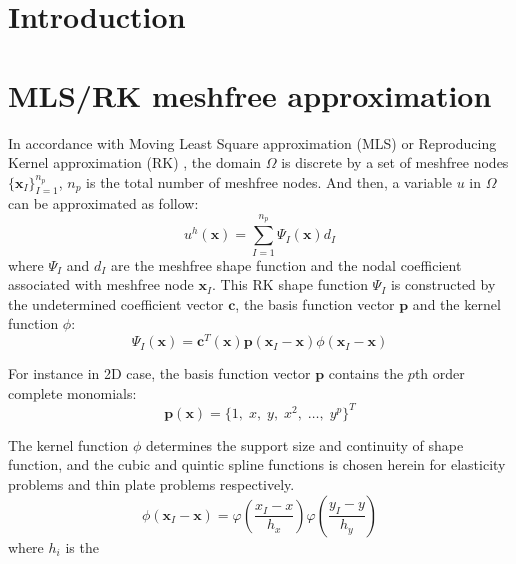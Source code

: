 \documentclass{article}
\begin{document}
\section{Introduction}
\section{MLS/RK meshfree approximation}
In accordance with Moving Least Square approximation (MLS) \cite{belytschkoElementFreeGalerkin1994} or Reproducing Kernel approximation (RK) \cite{liu1995reproducing}, the domain $\Omega$ is discrete by a set of meshfree nodes $\{\boldsymbol x_I\}_{I=1}^{n_p}$, $n_p$ is the total number of meshfree nodes. And then, a variable $u$ in $\Omega$ can be approximated as follow:
\begin{equation}
    u^h(\boldsymbol x) = \sum_{I=1}^{n_p} \Psi_I(\boldsymbol x) d_I
\end{equation}
where $\Psi_I$ and $d_I$ are the meshfree shape function and the nodal coefficient associated with meshfree node $\boldsymbol x_I$. This RK shape function $\Psi_I$ is constructed by the undetermined coefficient vector $\boldsymbol c$, the basis function vector $\boldsymbol p$ and the kernel function $\phi$:
\begin{equation}
    \Psi_I(\boldsymbol x) = \boldsymbol c^{T}(\boldsymbol x) \boldsymbol p(\boldsymbol x_I - \boldsymbol x) \phi(\boldsymbol x_I - \boldsymbol x)
    \label{shapefunction}
\end{equation} \par
For instance in 2D case, the basis function vector $\boldsymbol p$ contains the $p$th order complete monomials:
\begin{equation}
    \boldsymbol p(\boldsymbol x) = \{1,\;x,\;y,\;x^2,\;\dots,\;y^p\}^T
\end{equation} \par
The kernel function $\phi$ determines the support size and continuity of shape function, and the cubic and quintic spline functions is chosen herein for elasticity problems and thin plate problems respectively.
\begin{equation}
    \phi(\boldsymbol x_I - \boldsymbol x) = \varphi(\frac{x_I-x}{h_x})\varphi(\frac{y_I-y}{h_y})
\end{equation}
where $h_i$ is the 
\end{document}
